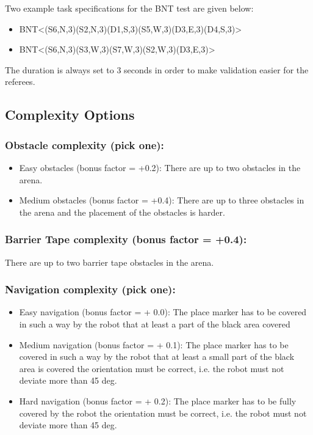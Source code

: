 Two example task specifications for the BNT test are given below:

\begin{itemize}
	\item BNT\textless(S6,N,3)(S2,N,3)(D1,S,3)(S5,W,3)(D3,E,3)(D4,S,3)\textgreater
	\item BNT\textless(S6,N,3)(S3,W,3)(S7,W,3)(S2,W,3)(D3,E,3)\textgreater
\end{itemize}

The duration is always set to 3 seconds in order to make validation easier for the referees.

\subsection{Complexity Options}

\subsubsection{Obstacle complexity (pick one):}

\begin{itemize}
	\item Easy obstacles (bonus factor = +0.2): There are up to two obstacles in the arena.
	\item Medium obstacles (bonus factor =  +0.4): There are up to three obstacles in the arena and the placement of the obstacles is harder.
\end{itemize}


\subsubsection{Barrier Tape complexity (bonus factor = +0.4):}
There are up to two barrier tape obstacles in the arena.

\subsubsection{Navigation complexity (pick one):}

\begin{itemize}
	\item Easy navigation (bonus factor = + 0.0): The place marker has to be covered in such a way by the robot that at least a part of the black area covered
	\item Medium navigation (bonus factor = + 0.1): The place marker has to be covered in such a way by the robot that at least a small part of the black area is covered the orientation must be correct, i.e. the robot must not deviate more than 45 deg.
	\item Hard navigation (bonus factor = + 0.2): The place marker has to be fully covered by the robot the orientation must be correct, i.e. the robot must not deviate more than 45 deg.
\end{itemize}


